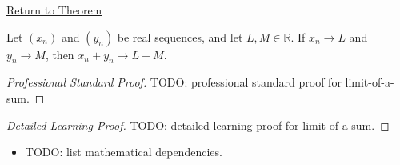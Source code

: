 \newpage
{}
\label{prf:limit-of-a-sum}

\begin{remark*}[Return]
\hyperref[thm:limit-of-a-sum]{Return to Theorem}
\end{remark*}

\begin{theorem*}
Let $(x_n)$ and $(y_n)$ be real sequences, and let $L,M\in\mathbb{R}$.
If $x_n\to L$ and $y_n\to M$, then $x_n+y_n\to L+M$.

\smallskip
\noindent
\end{theorem*}

\begin{proof}[Professional Standard Proof]
\LRAProofBodyStart
TODO: professional standard proof for limit-of-a-sum.
\end{proof}

\begin{proof}[Detailed Learning Proof]
\LRAProofBodyStart
TODO: detailed learning proof for limit-of-a-sum.
\end{proof}

\begin{remark*}
\end{remark*}

\begin{dependencies}
\begin{itemize}
  \item TODO: list mathematical dependencies.
\end{itemize}
\end{dependencies}

\clearpage
